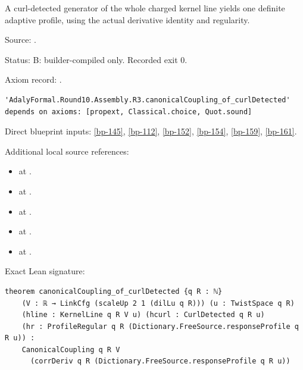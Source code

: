 \begin{theorem}[bp-162]
\label{bp-162}
\leanok
A curl-detected generator of the whole charged kernel line yields one definite adaptive profile, using the actual derivative identity and regularity.

\par Source: \texttt{}.
\par Status: B: builder-compiled only. Recorded exit 0.
\par Axiom record: \texttt{}.
\begin{verbatim}
'AdalyFormal.Round10.Assembly.R3.canonicalCoupling_of_curlDetected' depends on axioms: [propext, Classical.choice, Quot.sound]
\end{verbatim}
\par Direct blueprint inputs: \ref{bp-145}, \ref{bp-112}, \ref{bp-152}, \ref{bp-154}, \ref{bp-159}, \ref{bp-161}.
\par Additional local source references:
\begin{itemize}
\item \texttt{} at \texttt{}.
\item \texttt{} at \texttt{}.
\item \texttt{} at \texttt{}.
\item \texttt{} at \texttt{}.
\item \texttt{} at \texttt{}.
\end{itemize}
\par Exact Lean signature:
\begin{verbatim}
theorem canonicalCoupling_of_curlDetected {q R : ℕ}
    (V : ℝ → LinkCfg (scaleUp 2 1 (dilLu q R))) (u : TwistSpace q R)
    (hline : KernelLine q R V u) (hcurl : CurlDetected q R u)
    (hr : ProfileRegular q R (Dictionary.FreeSource.responseProfile q R u)) :
    CanonicalCoupling q R V
      (corrDeriv q R (Dictionary.FreeSource.responseProfile q R u))
\end{verbatim}
\end{theorem}

